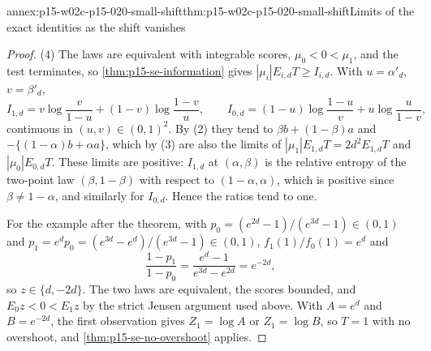 \begin{annexitem}{annex:p15-w02c-p15-020-small-shift}{thm:p15-w02c-p15-020-small-shift}{Limits of the exact identities as the shift vanishes}
\begin{proof}
(4) The laws are equivalent with integrable scores, \(\mu_0<0<\mu_1\),
and the test terminates, so \cref{thm:p15-se-information} gives
\(|\mu_i|E_{i,d}T\geq I_{i,d}\). With \(u=\alpha'_d\), \(v=\beta'_d\),
\[
 I_{1,d}=v\log\frac v{1-u}+(1-v)\log\frac{1-v}u,\qquad
 I_{0,d}=(1-u)\log\frac{1-u}v+u\log\frac u{1-v},
\]
continuous in \((u,v)\in(0,1)^2\). By (2) they tend to
\(\beta b+(1-\beta)a\) and \(-\{(1-\alpha)b+\alpha a\}\), which by (3)
are also the limits of \(|\mu_1|E_{1,d}T=2d^2E_{1,d}T\) and
\(|\mu_0|E_{0,d}T\). These limits are positive: \(I_{1,d}\) at
\((\alpha,\beta)\) is the relative entropy of the two-point law
\((\beta,1-\beta)\) with respect to \((1-\alpha,\alpha)\), which is
positive since \(\beta\neq1-\alpha\), and similarly for \(I_{0,d}\).
Hence the ratios tend to one.

For the example after the theorem, with \(p_0=(e^{2d}-1)/(e^{3d}-1)\in(0,1)\)
and \(p_1=e^dp_0=(e^{3d}-e^d)/(e^{3d}-1)\in(0,1)\),
\(f_1(1)/f_0(1)=e^d\) and
\[
 \frac{1-p_1}{1-p_0}=\frac{e^d-1}{e^{3d}-e^{2d}}=e^{-2d},
\]
so \(z\in\{d,-2d\}\). The two laws are equivalent, the scores bounded,
and \(E_0z<0<E_1z\) by the strict Jensen argument used above. With
\(A=e^d\) and \(B=e^{-2d}\), the first observation gives \(Z_1=\log A\)
or \(Z_1=\log B\), so \(T=1\) with no overshoot, and
\cref{thm:p15-se-no-overshoot} applies.
\end{proof}
\end{annexitem}

